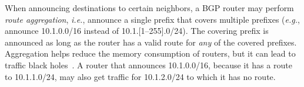 \documentclass[numbers, 10pt, preprint]{sigplanconf}
\newcommand{\EG}{\emph{e.g.}}
\newcommand{\IE}{\emph{i.e.}}
\newcommand{\ETC}{\emph{etc.}}
\begin{document}

When announcing destinations to certain neighbors, a BGP router may perform {\em route aggregation}, \IE, announce a single prefix that covers multiple prefixes (\EG, announce 10.1.0.0/16 instead of 10.1.[1--255].0/24). The covering prefix is announced as long as the router has a valid route for {\em any} of the covered prefixes. Aggregation helps reduce the memory consumption of routers, but it can lead to traffic black holes~\cite{route-aggregation}. A router that announces 10.1.0.0/16, because it has a route to 10.1.1.0/24, may also get traffic for 10.1.2.0/24 to which it has no route.

\end{document}
